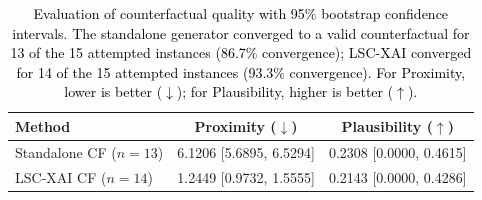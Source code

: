 \documentclass[a4paper,fleqn]{cas-sc}
\begin{document}
\begin{table}[pos=H]
\caption{\textcolor{black}{Evaluation of counterfactual quality with 95\% bootstrap confidence intervals. The standalone generator converged to a valid counterfactual for 13 of the 15 attempted instances (86.7\% convergence); LSC-XAI converged for 14 of the 15 attempted instances (93.3\% convergence). For Proximity, lower is better ($\downarrow$); for Plausibility, higher is better ($\uparrow$).}}
\label{tab:cf_metrics}
\renewcommand{\arraystretch}{1.5}
\begin{tabular}{lcc}
\hline
\textbf{Method} & \textbf{Proximity} ($\downarrow$) & \textbf{Plausibility} ($\uparrow$) \\
\hline
Standalone CF ($n=13$) & 6.1206 [5.6895, 6.5294] & 0.2308 [0.0000, 0.4615] \\
LSC-XAI CF ($n=14$)    & 1.2449 [0.9732, 1.5555] & 0.2143 [0.0000, 0.4286] \\
\hline
\end{tabular}
\end{table}
\end{document}
